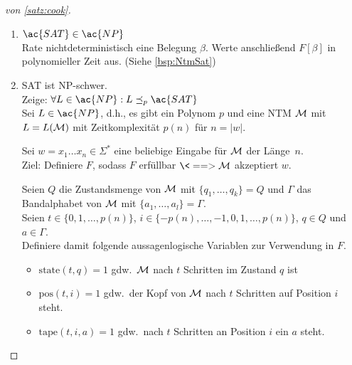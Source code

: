 \begin{proof}[von \autoref{satz:cook}]\
	\begin{enumerate}
	\item $\ac{SAT} \in \ac{NP}$\\
		Rate nichtdeterministisch eine Belegung $\beta$. 
		Werte anschließend $F[\beta]$ in polynomieller Zeit aus.
		(Siehe \autoref{bsp:NtmSat})
	\item \ac{SAT} ist \ac{NP}-schwer.\\
		Zeige: $\forall L\in \ac{NP}: L \preceq_p \ac{SAT}$\\
		Sei $L\in \ac{NP}$, d.h., es gibt ein Polynom $p$ und eine \ac{NTM} $\mathcal{M}$ mit $L=L(\mathcal{M})$ mit Zeitkomplexität $p(n)$ für $n = |w|$.
		
		Sei $w = x_1\dots x_n\in\Sigma^*$ eine beliebige Eingabe für $\mathcal{M}$ der Länge~$n$.\\
		Ziel: Definiere $F$, sodass $F$ erfüllbar $\<==> \M$ akzeptiert $w$.
		
		Seien $Q$ die Zustandsmenge von $\mathcal{M}$ mit $\{q_1,\dots,q_k\}=Q$ und $\Gamma$ das Bandalphabet von $\mathcal{M}$ mit $\{a_1,\dots,a_l\} = \Gamma$.\\
		Seien $t\in\{0,1,\dots,p(n)\}$, $i\in\{-p(n),\dots,-1,0,1,\dots,p(n)\}$, $q \in Q$ und $a\in\Gamma$. \\
		Definiere damit folgende aussagenlogische Variablen zur Verwendung in $F$.
		\begin{itemize}
		\item $\mathrm{state}(t,q) = 1$ gdw.\ $\mathcal{M}$ nach $t$ Schritten im Zustand $q$ ist
		\item $\mathrm{pos}(t,i) = 1$ gdw.\ der Kopf von $\mathcal{M}$ nach $t$ Schritten auf Position $i$ steht.
		\item $\mathrm{tape}(t,i,a) = 1$ gdw.\ nach $t$ Schritten an Position $i$ ein $a$ steht.
		\end{itemize}
	\end{enumerate}

	\medskip


\end{proof}
